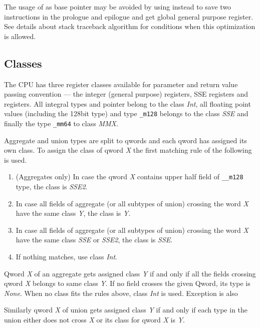 The usage of \RBP{} as base pointer may be avoided by using \RSP{} instead
to save two instructions in the prologue and epilogue and get global general
purpose register.  See details about stack traceback algorithm for conditions
when this optimization is allowed.

\subsection{Classes}

The \xARCH CPU has three register classes available for parameter and
return value passing convention --- the integer (general purpose)
registers, SSE registers and \MMX{} registers.  All integral types and
pointer belong to the class \emph{Int}, all floating point values
(including the 128bit type) and type \verb|_m128| belongs to the class
\emph{SSE} and finally the type \verb|_mm64| to class \emph{MMX}.

Aggregate and union types are split to qwords and each qword has
assigned its own class. To assign the class of qword \emph{X} the
first matching rule of the following is used.
\begin{enumerate}
  \item (Aggregates only) In case the qword \emph{X} contains upper half field of
    \verb|__m128| type, the class is \emph{SSE2}.

  \item In case all fields of aggregate (or all subtypes of union) crossing the
    word \emph{X} have the same class \emph{Y}, the class is \emph{Y}.

  \item In case all fields of aggregate (or all subtypes of union) crossing the
    word \emph{X} have the same class \emph{SSE} or \emph{SSE2}, the class
    is \emph{SSE}.

  \item If nothing matches, use class \emph{Int}.
\end{enumerate}

Qword \emph{X} of an aggregate gets assigned class \emph{Y} if and only
if all the fields crossing qword \emph{X} belongs to same class \emph{Y}.  If
no field crosses the given Qword, its type is \emph{None}. When no class fits
the rules above, class \emph{Int} is used.  Exception is also 

Similarly qword \emph{X} of union gets assigned class \emph{Y} if and only if
each type in the union either does not cross \emph{X} or its class for qword
\emph{X} is \emph{Y}.

